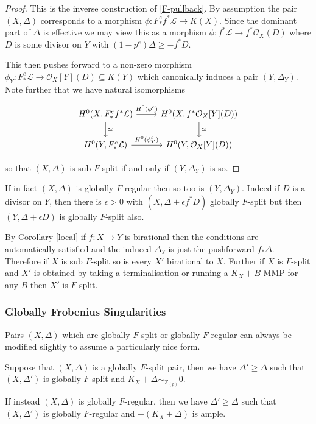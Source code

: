\documentclass[a4paper,12pt]{book}
\newcommand{\ox}{\mathcal{O}_{X}}
\newcommand{\zp}{\mathbb{Z}_{(p)}}
\begin{document}
\begin{proof}
	
	This is the inverse construction of \autoref{F-pullback}. By assumption the pair $(X,\Delta)$ corresponds to a morphism $\phi:F_{*}^{e}f^{*}\mathcal{L} \to K(X)$. Since the dominant part of $\Delta$ is effective we may view this as a morphism $\phi: f^{*}\mathcal{L} \to f^{*}\ox(D)$ where $D$ is some divisor on $Y$ with $(1-p^{e}) \Delta \geq -f^{*}D$.
	
	This then pushes forward to a non-zero morphism $\phi_{Y}:F_{*}^{e}\mathcal{L} \to \ox[Y](D) \subseteq K(Y)$ which canonically induces a pair $(Y,\Delta_{Y})$. Note further that we have natural isomorphisms

	\[\begin{tikzcd}
	{H^{0}(X,F_{*}^{e}f^{*}\mathcal{L})} \arrow[r, "H^{0}(\phi^{e})"] \arrow[d, "\simeq "] & {H^{0}(X,f^{*}\ox[Y](D))} \arrow[d, "\simeq"] \\
	{H^{0}(Y,F_{*}^{e}\mathcal{L})} \arrow[r, "H^{0}(\phi_{Y}^{e})"]                       & {H^{0}(Y,\ox[Y](D))}                         
	\end{tikzcd}\]
	
	so that $(X,\Delta)$ is sub $F$-split if and only if $(Y,\Delta_{Y})$ is so.	
\end{proof}

If in fact $(X,\Delta)$ is globally $F$-regular then so too is $(Y,\Delta_{Y})$. Indeed if $D$ is a divisor on $Y$, then there is $\epsilon > 0$ with $(X,\Delta+\epsilon f^{*}D)$ globally $F$-split but then $(Y,\Delta+\epsilon D)$ is globally $F$-split also.

By Corollary \ref{local} if $f:X \to Y$ is birational then the conditions are automatically satisfied and the induced $\Delta_{Y}$ is just the pushforward $f_{*}\Delta$. Therefore if $X$ is sub $F$-split so is every $X'$ birational to $X$. Further if $X$ is $F$-split and $X'$ is obtained by taking a terminalisation or running a $K_{X}+B$ MMP for any $B$ then $X'$ is $F$-split.

\subsubsection{Globally Frobenius Singularities}

Pairs $(X,\Delta)$ which are globally $F$-split or globally $F$-regular can always be modified slightly to assume a particularly nice form.

\begin{lemma}
	
	Suppose that $(X,\Delta)$ is a globally $F$-split pair, then we have $\Delta' \geq \Delta$ such that $(X,\Delta')$ is globally $F$-split and $K_{X}+\Delta \sim_{\zp} 0 $.
	
	If instead $(X,\Delta)$ is globally $F$-regular, then we have $\Delta' \geq \Delta$ such that $(X,\Delta')$ is globally $F$-regular and $-(K_{X}+\Delta)$ is ample.
	
	\end{lemma}
\end{document}
